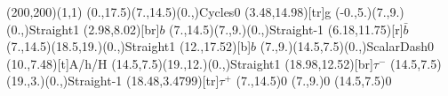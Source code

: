 \documentclass[12pt]{article}
\begin{document}
 
 \thispagestyle{empty}
	
 \begin{feynartspicture}(200,200)(1,1) 
 \FADiagram{} 
\FAProp(0.,17.5)(7.,14.5)(0.,){Cycles}{0}
\FALabel(3.48,14.98)[tr]{g}
\FAProp(-0.,5.)(7.,9.)(0.,){Straight}{1}
\FALabel(2.98,8.02)[br]{$b$}
\FAProp(7.,14.5)(7.,9.)(0.,){Straight}{-1}
\FALabel(6.18,11.75)[r]{$\bar{b}$}
\FAProp(7.,14.5)(18.5,19.)(0.,){Straight}{1}
\FALabel(12.,17.52)[b]{$b$}
\FAProp(7.,9.)(14.5,7.5)(0.,){ScalarDash}{0}
\FALabel(10.,7.48)[t]{A/h/H}
\FAProp(14.5,7.5)(19.,12.)(0.,){Straight}{1}
\FALabel(18.98,12.52)[br]{$\tau^-$}
\FAProp(14.5,7.5)(19.,3.)(0.,){Straight}{-1}
\FALabel(18.48,3.4799)[tr]{$\tau^+$}
\FAVert(7.,14.5){0}
\FAVert(7.,9.){0}
\FAVert(14.5,7.5){0}
 
	
 
 \end{feynartspicture} 
 
\end{document}
